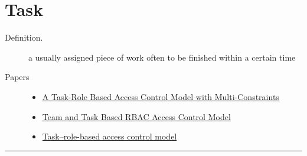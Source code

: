 \documentclass[letterpaper,10pt,english]{sphinxmanual}
\begin{document}
\chapter{Task}
\label{categories/task:task}\label{categories/task::doc}\begin{description}
\item[{Definition.}] \leavevmode
a usually assigned piece of work often to be finished within a certain time

\item[{Papers}] \leavevmode\begin{itemize}
\item {} 
\href{http://ieeexplore.ieee.org/xpls/abs\_all.jsp?arnumber=4623993}{A Task-Role Based Access Control Model with Multi-Constraints}

\item {} 
\href{http://en.cnki.com.cn/Article\_en/CJFDTOTAL-TXJS200911047.htm}{Team and Task Based RBAC Access Control Model}

\item {} 
\href{http://www.sciencedirect.com/science/article/pii/S0306437902000297}{Task–role-based access control model}

\end{itemize}

\end{description}


\bigskip\hrule{}\bigskip
\end{document}
